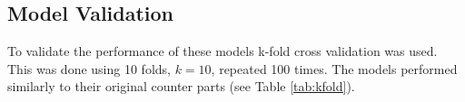 \documentclass[review,12pt,authoryear]{elsarticle}
\begin{document}
\begin{linenumbers}
%
%
%
%
\subsection{Model Validation}
\begin{table}[]
  \label{tab:kfold}
  \caption{Model validation using k-fold cross validation, for 10 folds repeated 100 times.}
  \end{table}
To validate the performance of these models k-fold cross validation was used. This was done using 10 folds, $k=10$, repeated 100 times. The models performed similarly to their original counter parts (see Table \ref{tab:kfold}).

\end{linenumbers}
\end{document}
